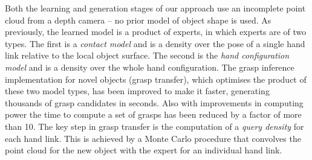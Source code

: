 Both the learning and generation stages of our approach use an incomplete point cloud from a depth camera -- no prior model of object shape is used. As previously, the learned model is a product of experts, in which experts are of two types. The first is a {\em contact model} and is a density over the pose of a single hand link relative to the local object surface. The second is the {\em hand configuration model} and is a density over the whole hand configuration. 
%
The grasp inference implementation for novel objects (grasp transfer), which optimises the product of these two model types, has been improved to make it faster, generating thousands of grasp candidates in seconds. Also with improvements in computing power the time to compute a set of grasps has been reduced by a factor of more than 10. The key step in grasp transfer is the computation of a {\em query density} for each hand link. This is achieved by a Monte Carlo procedure that convolves the point cloud for the new object with the expert for an individual hand link. 
%

